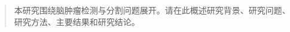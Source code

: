 \renewcommand{\headrulewidth}{0.4pt}

\begin{abstract}\songti\xiaosi
  本研究围绕脑肿瘤检测与分割问题展开。请在此概述研究背景、研究问题、研究方法、主要结果和研究结论。

\end{abstract}
